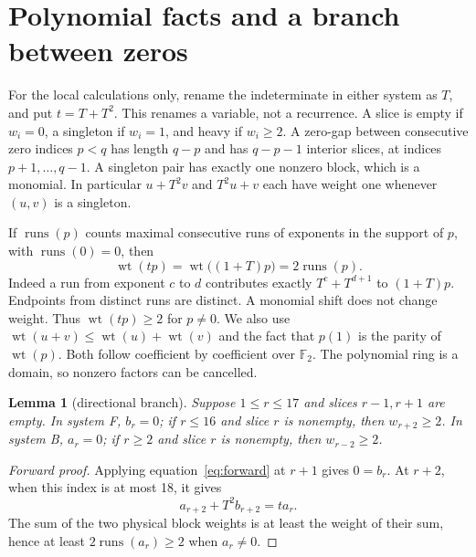 \documentclass{article}
\newtheorem{lemma}{Lemma}
\DeclareMathOperator{\wt}{wt}
\DeclareMathOperator{\runs}{runs}
\newcommand{\Ftwo}{\mathbb{F}_2}
\begin{document}
\section{Polynomial facts and a branch between zeros}\label{sec:branch}

For the local calculations only, rename the indeterminate in either system as \(T\), and put
\(t = T + T^2\). This renames a variable, not a recurrence. A slice is empty if \(w_i = 0\), a
singleton if \(w_i = 1\), and heavy if \(w_i \ge 2\). A zero-gap between consecutive zero
indices \(p < q\) has length \(q - p\) and has \(q - p - 1\) interior slices, at indices
\(p + 1, \dots, q - 1\). A singleton pair has exactly one nonzero block, which is a monomial.
In particular \(u + T^2 v\) and \(T^2 u + v\) each have weight one whenever \((u,v)\) is a
singleton.

If \(\runs(p)\) counts maximal consecutive runs of exponents in the support of \(p\), with
\(\runs(0) = 0\), then
\begin{equation}\label{eq:runs}
  \wt(tp) = \wt\bigl((1 + T)p\bigr) = 2\runs(p).
\end{equation}
Indeed a run from exponent \(c\) to \(d\) contributes exactly \(T^c + T^{d+1}\) to
\((1 + T)p\). Endpoints from distinct runs are distinct. A monomial shift does not change
weight. Thus \(\wt(tp) \ge 2\) for \(p \ne 0\). We also use
\(\wt(u + v) \le \wt(u) + \wt(v)\) and the fact that \(p(1)\) is the parity of \(\wt(p)\).
Both follow coefficient by coefficient over \(\Ftwo\). The polynomial ring is a domain, so
nonzero factors can be cancelled.

\begin{lemma}[directional branch]\label{lem:branch}
  Suppose \(1 \le r \le 17\) and slices \(r - 1, r + 1\) are empty. In system F, \(b_r = 0\);
  if \(r \le 16\) and slice \(r\) is nonempty, then \(w_{r+2} \ge 2\). In system B,
  \(a_r = 0\); if \(r \ge 2\) and slice \(r\) is nonempty, then \(w_{r-2} \ge 2\).
\end{lemma}

\begin{proof}[Forward proof]
  Applying equation~\eqref{eq:forward} at \(r + 1\) gives \(0 = b_r\). At \(r + 2\), when
  this index is at most 18, it gives
  \begin{equation}
    a_{r+2} + T^2 b_{r+2} = t a_r.
  \end{equation}
  The sum of the two physical block weights is at least the weight of their sum, hence at
  least \(2\runs(a_r) \ge 2\) when \(a_r \ne 0\).
\end{proof}
\end{document}
